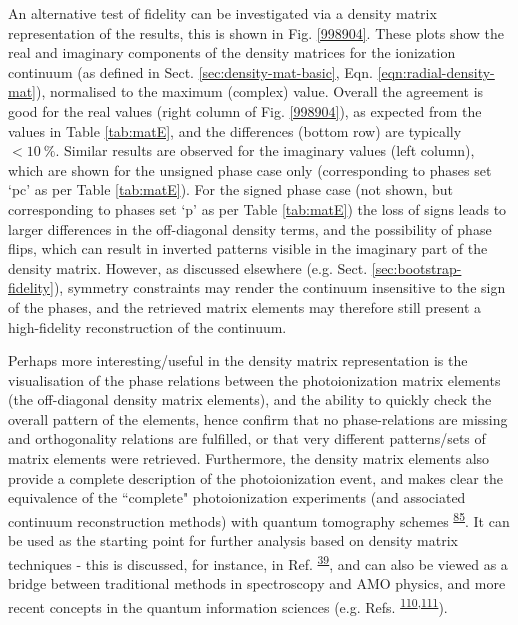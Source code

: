 \documentclass[10pt]{article}
\begin{document}
An alternative test of fidelity can be investigated via a density matrix representation of the results, this is shown in Fig. \ref{998904}. These plots show the real and imaginary components of the density matrices for the ionization continuum (as defined in Sect. \ref{sec:density-mat-basic}, Eqn. \ref{eqn:radial-density-mat}), normalised to the maximum (complex) value. Overall the agreement is good for the real values (right column of Fig. \ref{998904}), as expected from the values in Table \ref{tab:matE}, and the differences (bottom row) are typically $<10~\%$. Similar results are observed for the imaginary values (left column), which are shown for the unsigned phase case only (corresponding to phases set `pc' as per Table \ref{tab:matE}). For the signed phase case (not shown, but corresponding to phases set `p' as per Table \ref{tab:matE}) the loss of signs leads to larger differences in the off-diagonal density terms, and the possibility of phase flips, which 
can result in inverted patterns visible in the imaginary part of the density matrix. However, as discussed elsewhere (e.g. Sect. \ref{sec:bootstrap-fidelity}), symmetry constraints may render the continuum insensitive to the sign of the phases, and the retrieved matrix elements may therefore still present a high-fidelity reconstruction of the continuum.

Perhaps more interesting/useful in the density matrix representation is the visualisation of the phase relations between the photoionization matrix elements (the off-diagonal density matrix elements), and the ability to quickly check the overall pattern of the elements, hence confirm that no phase-relations are missing and orthogonality relations are fulfilled, or that very different patterns/sets of matrix elements were retrieved. Furthermore, the density matrix elements also provide a complete description of the photoionization event, and makes clear the equivalence of the ``complete" photoionization experiments (and associated continuum reconstruction methods) with quantum tomography schemes \textsuperscript{\hyperref[csl:85]{85}}. It can be used as the starting point for further analysis based on density matrix techniques - this is discussed, for instance, in Ref. \textsuperscript{\hyperref[csl:39]{39}}, and can also be viewed as a bridge between traditional methods in spectroscopy and AMO physics, and more recent concepts in the quantum information sciences (e.g. Refs.  \textsuperscript{\hyperref[csl:110]{110},\hyperref[csl:111]{111}}).
\end{document}
